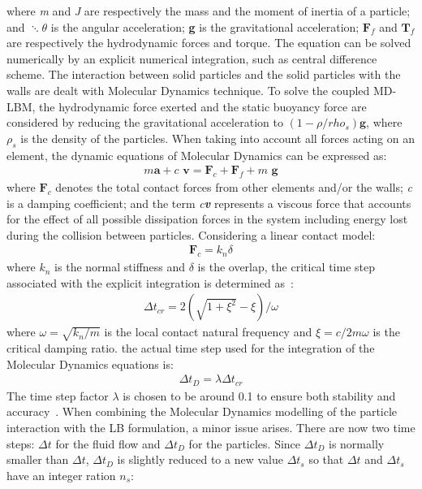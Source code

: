 where \textit{m} and \textit{J} are respectively the mass and the moment of inertia of a particle; and $\ddots{\theta}$ is the angular acceleration; \textbf{g} is the gravitational acceleration; $\mathbf{F}_{f}$ and $\mathbf{T}_{f}$ are respectively the hydrodynamic forces and torque. The equation can be solved numerically by an explicit numerical integration, such as central difference scheme. The interaction between solid particles and the solid particles with the walls are dealt with Molecular Dynamics technique. To solve the coupled MD-LBM, the hydrodynamic force exerted and the static buoyancy force are considered by reducing the gravitational acceleration to $(1- \rho/rho_{s})\mathbf{g}$, where $\rho_{s}$ is the density of the particles. When taking into account all forces acting on an element, the dynamic equations of Molecular Dynamics can be expressed as:
\begin{align}
\textit{m}\mathbf{ a} + \textit{c }\mathbf{v} = \mathbf{F}_{c} + \mathbf{F}_{f} +\textit{m }\mathbf{g}
\label{eq:mde}
\end{align} 
where $\mathbf{F}_{c}$ denotes the total contact forces from other elements and/or the walls; \textit{c} is a damping coefficient; and the term \textit{c\textbf{v}} represents a viscous force that accounts for the effect of all possible dissipation forces in the system including energy lost during the collision between particles. Considering a linear contact model:
\begin{align}
\mathbf{F}_{c}=\textit{k}_{\textit{n}} \delta
\end{align}
where $\textit{k}_{\textit{n}}$ is the normal stiffness and $\delta$ is the overlap, the critical time step associated with the explicit integration is determined as~\citep{he1997}:
\begin{align}
\Delta t_{\textit{cr}}= 2(\sqrt{1 + \xi^{2}}-\xi) / \omega
\end{align}
where $\omega = \sqrt{\textit{k}_{\textit{n}}/\textit{m}}$ is the local contact natural frequency and $\xi = \textit{c}/2\textit{m}\omega$ is the critical damping ratio. the actual time step used for the integration of the Molecular Dynamics equations is:
\begin{align}
\Delta \textit{t}_{D}=\lambda \Delta \textit{t}_{cr}
\end{align}
The time step factor $\lambda$ is chosen to be around 0.1 to ensure both stability and accuracy~\citep{he1997}. When combining the Molecular Dynamics modelling of the particle interaction with the LB formulation, a minor issue arises. There are now two time steps: $\Delta t$ for the fluid flow and $\Delta t_{D}$ for the particles. Since $\Delta t_{D}$ is normally smaller than $\Delta t$, $\Delta t_{D}$ is slightly reduced to a new value $\Delta t_{s}$ so that $\Delta t$ and $\Delta t_{s}$ have an integer ration $\textit{n}_{\textit{s}}$:
